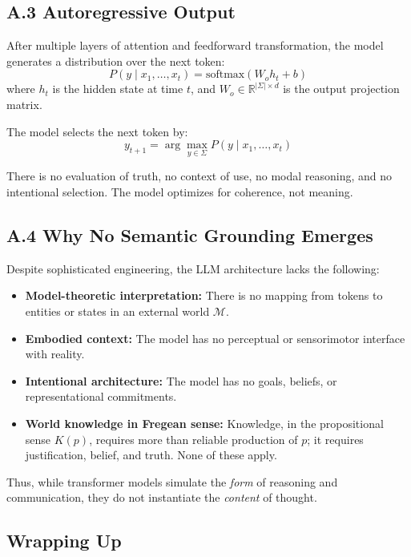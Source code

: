 \subsection*{A.3 Autoregressive Output}

After multiple layers of attention and feedforward transformation, the model generates a distribution over the next token:
\[
P(y \mid x_1, \dots, x_t) = \text{softmax}(W_o h_t + b)
\]
where \( h_t \) is the hidden state at time \( t \), and \( W_o \in \mathbb{R}^{|\Sigma| \times d} \) is the output projection matrix.

The model selects the next token by:
\[
y_{t+1} = \arg\max_{y \in \Sigma} P(y \mid x_1, \dots, x_t)
\]

There is no evaluation of truth, no context of use, no modal reasoning, and no intentional selection. The model optimizes for coherence, not meaning.

\subsection*{A.4 Why No Semantic Grounding Emerges}

Despite sophisticated engineering, the LLM architecture lacks the following:

\begin{itemize}
    \item \textbf{Model-theoretic interpretation:} There is no mapping from tokens to entities or states in an external world \( \mathcal{M} \).
    \item \textbf{Embodied context:} The model has no perceptual or sensorimotor interface with reality.
    \item \textbf{Intentional architecture:} The model has no goals, beliefs, or representational commitments.
    \item \textbf{World knowledge in Fregean sense:} Knowledge, in the propositional sense \( K(p) \), requires more than reliable production of \( p \); it requires justification, belief, and truth. None of these apply.
\end{itemize}

Thus, while transformer models simulate the \textit{form} of reasoning and communication, they do not instantiate the \textit{content} of thought.

\subsection*{Wrapping Up}

